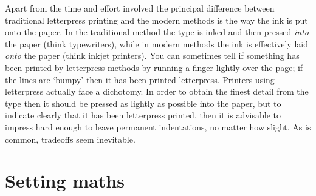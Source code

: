 \documentclass[10pt,a4paper,oneside,extrafontsizes]{memoir}%
\begin{document}
\begin{paracol}{2}
   Apart from the time and effort involved the principal difference between
traditional letterpress printing and the modern methods 
is the way the ink is put onto the paper. In the traditional method the type
is inked and then pressed \emph{into} the paper (think typewriters), while 
in modern methods the ink is effectively laid \emph{onto} the paper (think
inkjet printers). You can sometimes tell if something has 
been printed by letterpress methods by running a finger lightly over the page;
if the lines are `bumpy' then it has been printed letterpress. Printers using
letterpress actually face a dichotomy. In order to obtain the finest detail
from the type then it should be pressed as lightly as possible into the paper,
but to indicate clearly that it has been letterpress printed, then it is 
advisable to impress hard enough to leave permanent indentations, no matter
how slight. As is common, tradeoffs seem inevitable.
\end{paracol}


\section{Setting maths}
\end{document}
